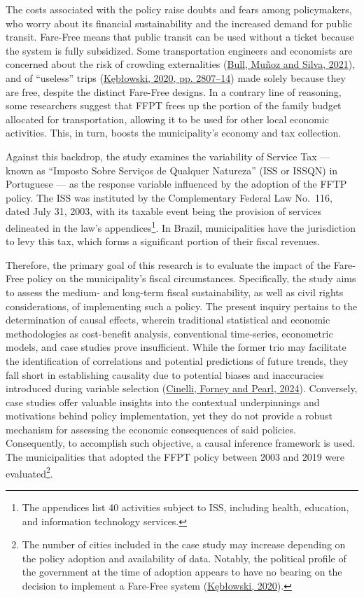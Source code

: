 \documentclass[12pt, a4paper, twoside]{article}
\numberwithin{equation}{subsection} %
\begin{document}
The costs associated with the policy raise doubts and fears among
policymakers, who worry about its financial sustainability and the
increased demand for public transit. Fare-Free means that public transit
can be used without a ticket because the system is fully subsidized.
Some transportation engineers and economists are concerned about the
risk of crowding externalities
(\protect\hyperlink{ref-BULL-RCT-2021}{Bull, Muñoz and Silva, 2021}),
and of ``useless'' trips
(\protect\hyperlink{ref-keblowski_why_2020}{Kębłowski, 2020, pp.
2807--14}) made solely because they are free, despite the distinct
Fare-Free designs. In a contrary line of reasoning, some researchers
suggest that FFPT frees up the portion of the family budget allocated
for transportation, allowing it to be used for other local economic
activities. This, in turn, boosts the municipality's economy and tax
collection.

Against this backdrop, the study examines the variability of Service Tax
--- known as ``Imposto Sobre Serviços de Qualquer Natureza'' (ISS or
ISSQN) in Portuguese --- as the response variable influenced by the
adoption of the FFTP policy. The ISS was instituted by the Complementary
Federal Law No.~116, dated July 31, 2003, with its taxable event being
the provision of services delineated in the law's appendices\footnote{The
  appendices list 40 activities subject to ISS, including health,
  education, and information technology services.}. In Brazil,
municipalities have the jurisdiction to levy this tax, which forms a
significant portion of their fiscal revenues.

Therefore, the primary goal of this research is to evaluate the impact
of the Fare-Free policy on the municipality's fiscal circumstances.
Specifically, the study aims to assess the medium- and long-term fiscal
sustainability, as well as civil rights considerations, of implementing
such a policy. The present inquiry pertains to the determination of
causal effects, wherein traditional statistical and economic
methodologies as cost-benefit analysis, conventional time-series,
econometric models, and case studies prove insufficient. While the
former trio may facilitate the identification of correlations and
potential predictions of future trends, they fall short in establishing
causality due to potential biases and inaccuracies introduced during
variable selection (\protect\hyperlink{ref-Cinelli-2024}{Cinelli, Forney
and Pearl, 2024}). Conversely, case studies offer valuable insights into
the contextual underpinnings and motivations behind policy
implementation, yet they do not provide a robust mechanism for assessing
the economic consequences of said policies. Consequently, to accomplish
such objective, a causal inference framework is used. The municipalities
that adopted the FFPT policy between 2003 and 2019 were
evaluated\footnote{The number of cities included in the case study may
  increase depending on the policy adoption and availability of data.
  Notably, the political profile of the government at the time of
  adoption appears to have no bearing on the decision to implement a
  Fare-Free system
  (\protect\hyperlink{ref-keblowski_why_2020}{Kębłowski, 2020}).}.
\end{document}
